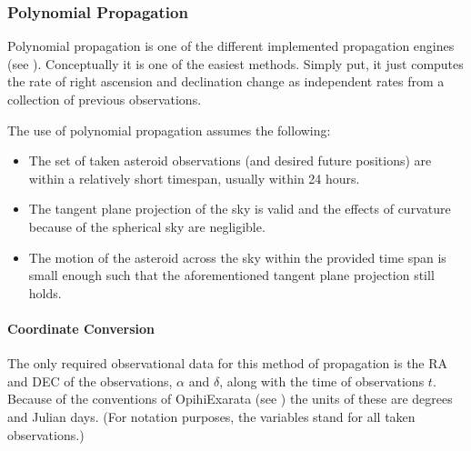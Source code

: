 \documentclass[letterpaper,11pt,english]{sphinxmanual}
\begin{document}
\sphinxstepscope


\subsubsection{Polynomial Propagation}
\label{\detokenize{technical/algorithms/polynomial_propagation:polynomial-propagation}}\label{\detokenize{technical/algorithms/polynomial_propagation:technical-algorithms-polynomial-propagation}}\label{\detokenize{technical/algorithms/polynomial_propagation::doc}}
\sphinxAtStartPar
Polynomial propagation is one of the different implemented propagation engines
(see {\hyperref[\detokenize{technical/architecture/services_engines:technical-architecture-services-engines}]{}}). Conceptually it is one
of the easiest methods. Simply put, it just computes the rate of right
ascension and declination change as independent rates from a collection of
previous observations.

\sphinxAtStartPar
The use of polynomial propagation assumes the following:
\begin{itemize}
\item {} 
\sphinxAtStartPar
The set of taken asteroid observations (and desired future positions) are within a relatively short timespan, usually within 24 hours.

\item {} 
\sphinxAtStartPar
The tangent plane projection of the sky is valid and the effects of curvature because of the spherical sky are negligible.

\item {} 
\sphinxAtStartPar
The motion of the asteroid across the sky within the provided time span is small enough such that the aforementioned tangent plane projection still holds.

\end{itemize}


\paragraph{Coordinate Conversion}
\label{\detokenize{technical/algorithms/polynomial_propagation:coordinate-conversion}}
\sphinxAtStartPar
The only required observational data for this method of propagation is the
RA and DEC of the observations, \(\alpha\) and \(\delta\), along with
the time of observations \(t\). Because of the conventions of OpihiExarata
(see {\hyperref[\detokenize{technical/conventions:technical-conventions}]{}}) the units of these are degrees and Julian
days. (For notation purposes, the variables stand for all taken observations.)
\end{document}
